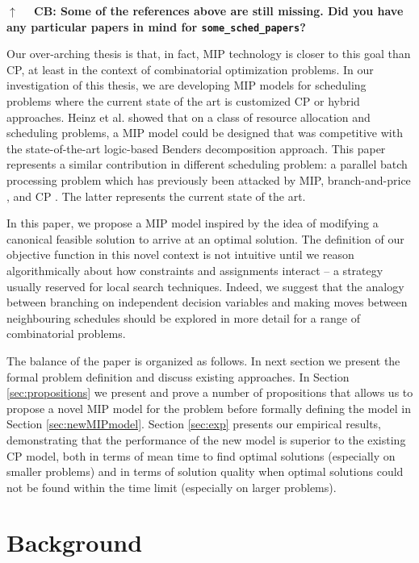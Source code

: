 \documentclass[oribibl]{llncs}
\begin{document}
\textbf{$\uparrow \quad$ CB: Some of the references above are still missing. Did
you have any particular papers in mind for \texttt{some\_sched\_papers}?}

Our over-arching thesis is that, in fact, MIP technology is closer to
this goal than CP, at least in the context of combinatorial optimization
problems. In our investigation of this thesis, we are developing MIP
models for scheduling problems where the current state of the art is
customized CP or hybrid approaches. Heinz et al. \cite{Heinz} showed
that on a class of resource allocation and scheduling problems, a MIP
model could be designed that was competitive with the state-of-the-art
logic-based Benders decomposition approach. This paper represents a
similar contribution in different scheduling problem: a parallel batch
processing problem which has previously been attacked by MIP,
branch-and-price \cite{Daste1}, and CP \cite{Malapert}. The latter represents
the current state of the art.

In this paper, we propose a MIP model inspired by the idea of modifying
a canonical feasible solution to arrive at an optimal solution.
The definition of our objective function in this novel context is not
intuitive until we reason algorithmically about how constraints and
assignments interact -- a strategy usually reserved for local search
techniques. Indeed, we suggest that the analogy between branching
on independent decision variables and making moves between
neighbouring schedules should be explored in more detail for a range of
combinatorial problems.

The balance of the paper is organized as follows. In next section we
present the formal problem definition and discuss existing approaches.
In Section \ref{sec:propositions} we present and prove a number of
propositions that allows us to propose a novel MIP model for the problem
before formally defining the model in Section \ref{sec:newMIPmodel}.
Section \ref{sec:exp} presents our empirical results, demonstrating
that the performance of the new model is superior to the existing CP
model, both in terms of mean time to find optimal solutions (especially
on smaller problems) and in terms of solution quality when optimal
solutions could not be found within the time limit (especially on larger
problems).

\section{Background}
\label{sec:background}
\end{document}
